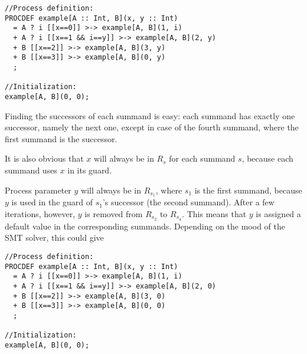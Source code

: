 \begin{lstlisting}
//Process definition:
PROCDEF example[A :: Int, B](x, y :: Int)
  = A ? i [[x==0]] >-> example[A, B](1, i)
  + A ? i [[x==1 && i==y]] >-> example[A, B](2, y)
  + B [[x==2]] >-> example[A, B](3, y)
  + B [[x==3]] >-> example[A, B](0, y)
  ;

//Initialization:
example[A, B](0, 0);
\end{lstlisting}

Finding the successors of each summand is easy: each summand has exactly one successor, namely the next one, except in case of the fourth summand, where the first summand is the successor.

It is also obvious that $x$ will always be in $R_s$ for each summand $s$, because each summand uses $x$ in its guard.

Process parameter $y$ will always be in $R_{s_1}$, where $s_1$ is the first summand, because $y$ is used in the guard of $s_1$'s successor (the second summand).
After a few iterations, however, $y$ is removed from $R_{s_2}$ to $R_{s_4}$.
This means that $y$ is assigned a default value in the corresponding summands.
Depending on the mood of the SMT solver, this could give

\begin{lstlisting}
//Process definition:
PROCDEF example[A :: Int, B](x, y :: Int)
  = A ? i [[x==0]] >-> example[A, B](1, i)
  + A ? i [[x==1 && i==y]] >-> example[A, B](2, 0)
  + B [[x==2]] >-> example[A, B](3, 0)
  + B [[x==3]] >-> example[A, B](0, 0)
  ;

//Initialization:
example[A, B](0, 0);
\end{lstlisting}




